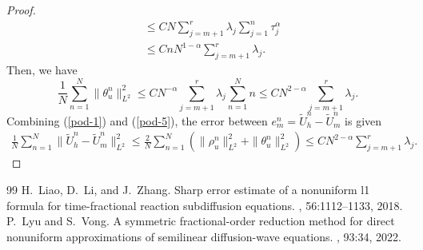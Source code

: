 \documentclass[10pt,a4paper]{amsart}
\begin{document}
\begin{proof}
\begin{align*}
&\leq CN\sum_{j=m+1}^r\lambda_j\sum_{j=1}^{n}\tau_j^{\alpha}\\
&\leq CnN^{1-\alpha}\sum_{j=m+1}^r\lambda_j.
\end{align*}
Then, we have
\begin{equation}\label{pod-5}
\frac{1}{N}\sum_{n=1}^N\|\theta_u^n\|_{L^2}^2
\leq  CN^{-\alpha}\sum_{j=m+1}^r\lambda_j\sum_{n=1}^Nn
\leq  CN^{2-\alpha}\sum_{j=m+1}^r\lambda_j.  
\end{equation}
Combining (\ref{pod-1}) and (\ref{pod-5}), the error between $e_m^n=\widetilde{U}_h^n-\widetilde{U}_m^n$ is given
\begin{align*}
\frac{1}{N}\sum_{n=1}^N\|\widetilde{U}_h^n-\widetilde{U}_m^n\|_{L^2}^2\leq  \frac{2}{N}\sum_{n=1}^N(\|\rho_u^n\|_{L^2}^2+\|\theta_u^n\|_{L^2}^2)\leq CN^{2-\alpha}\sum_{j=m+1}^r\lambda_j.    
\end{align*}
\end{proof}

\begin{thebibliography}{99}
 H.~Liao, D.~Li, and J.~Zhang. \newblock Sharp error estimate of a nonuniform l1 formula for time-fractional reaction subdiffusion equations. , 56:1112--1133, 2018.
 P.~Lyu and S.~Vong. \newblock A symmetric fractional-order reduction method for direct nonuniform approximations of semilinear diffusion-wave equations. , 93:34, 2022.
\end{thebibliography}
\end{document}
